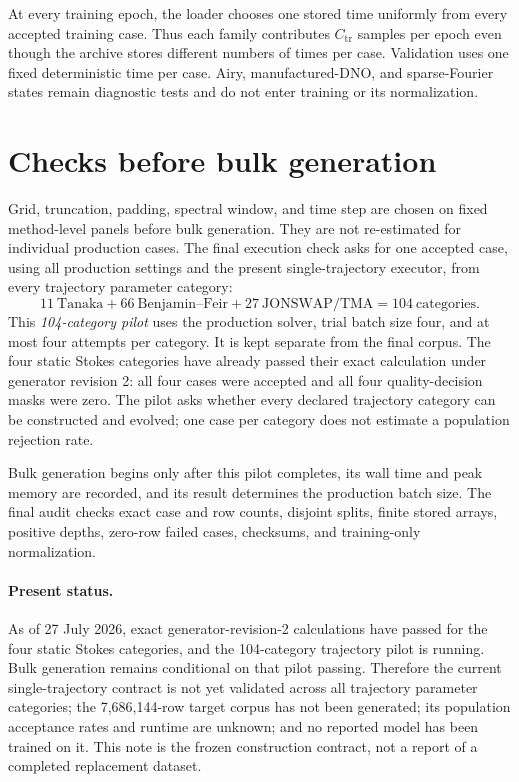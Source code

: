 \documentclass[10pt]{article}
\begin{document}
At every training epoch, the loader chooses one stored time uniformly from
every accepted training case.  Thus each family contributes
$C_{\mathrm{tr}}$ samples per epoch even though the archive stores different
numbers of times per case.  Validation uses one fixed deterministic time per
case.  Airy,
manufactured-DNO, and sparse-Fourier states remain diagnostic tests and do
not enter training or its normalization.

\section{Checks before bulk generation}
\label{sec:release}

Grid, truncation, padding, spectral window, and time step are chosen on
fixed method-level panels before bulk generation.  They are not re-estimated
for individual production cases.  The final execution check asks for one
accepted case, using all production settings and the present
single-trajectory executor, from every trajectory parameter category:
\[
  11\ \text{Tanaka}
  +66\ \text{Benjamin--Feir}
  +27\ \text{JONSWAP/TMA}
  =104\ \text{categories}.
\]
This \emph{104-category pilot} uses the production solver, trial batch size four,
and at most four attempts per category.  It is kept separate from the final
corpus.  The four static Stokes categories have already passed their exact
calculation under generator revision 2: all four cases were accepted and all
four quality-decision masks were zero.  The pilot asks whether every declared
trajectory category can be
constructed and evolved; one case per category does not estimate a population
rejection rate.

Bulk generation begins only after this pilot completes, its wall time and
peak memory are recorded, and its result determines the production batch
size.  The final audit checks exact case and row counts, disjoint splits,
finite stored arrays, positive depths, zero-row failed cases, checksums, and
training-only normalization.

\paragraph{Present status.}
As of 27 July 2026, exact generator-revision-2 calculations have passed for
the four static Stokes categories, and the 104-category trajectory pilot is
running.  Bulk generation remains conditional on that pilot passing.
Therefore the current single-trajectory contract is not yet validated across
all trajectory parameter categories; the 7,686,144-row target corpus has not
been generated; its population acceptance rates and runtime are unknown; and
no reported model has been trained on it.  This note is the frozen
construction contract, not a report of a completed replacement dataset.
\end{document}
